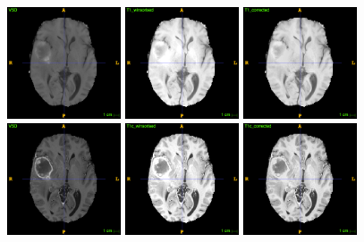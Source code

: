 \documentclass[12pt,a4paper,twoside,openright]{report}
\begin{document}
\begin{figure}
	\centering
	\label{fig:n4itk_example}
	\includegraphics[width=0.3\textwidth]{t1_no_norm_example}
	\includegraphics[width=0.3\textwidth]{t1_winsorized_example}
	\includegraphics[width=0.3\textwidth]{t1_n4itk_example} \\
	\vspace{0.5cm}
	\includegraphics[width=0.3\textwidth]{t1c_no_norm_example}
	\includegraphics[width=0.3\textwidth]{t1c_winsorized_example}
	\includegraphics[width=0.3\textwidth]{t1c_n4itk_example} \\

\end{figure}
\end{document}
